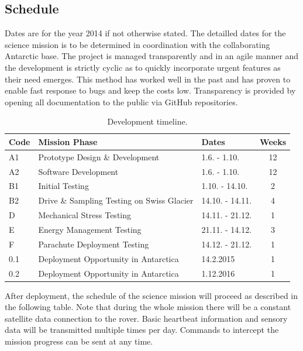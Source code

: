 \documentclass[a4paper,12pt]{article}
\begin{document}
\subsection{Schedule}

Dates are for the year 2014 if not otherwise stated. The detailled dates for the science mission is to be determined in coordination with the collaborating Antarctic base. The project is managed transparently and in an agile manner and the development is strictly cyclic as to quickly incorporate urgent features as their need emerges. This method has worked well in the past and has proven to enable fast response to bugs and keep the costs low. Transparency is provided by opening all documentation to the public via GitHub \cite{octanisgithub} repositories. 

\begin{table}[h!]
\centering
\begin{tabular}{ l | l | l | c }

\bfseries{Code} & \bfseries{Mission Phase} & \bfseries{Dates} & \bfseries{Weeks} \\
\hline
A1 & Prototype Design \& Development & 1.6. - 1.10. & 12 \\
A2 & Software Development & 1.6. - 1.10. & 12 \\
B1 & Initial Testing & 1.10. - 14.10. & 2  \\
B2 & Drive \& Sampling Testing on Swiss Glacier & 14.10. - 14.11. & 4 \\
D & Mechanical Stress Testing & 14.11. - 21.12. & 1 \\
E & Energy Management Testing & 21.11. - 14.12. & 3 \\
F & Parachute Deployment Testing & 14.12. - 21.12. & 1 \\
0.1 & Deployment Opportunity in Antarctica & 14.2.2015 &  1 \\
0.2 & Deployment Opportunity in Antarctica & 1.12.2016 &  1 \\

\end{tabular}
\caption{Development timeline.}
\end{table}

After deployment, the schedule of the science mission will proceed as described in the following table. Note that during the whole mission there will be a constant satellite data connection to the rover. Basic heartbeat information and sensory data will be transmitted multiple times per day. Commands to intercept the mission progress can be sent at any time.
\end{document}

